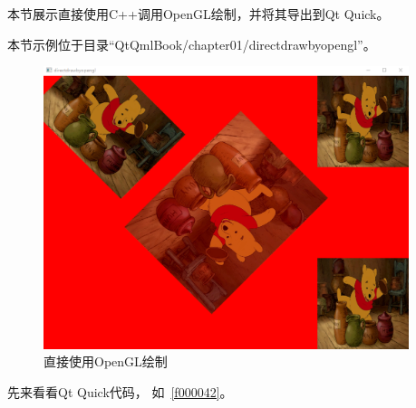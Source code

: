 本节展示直接使用C{\sourcefonttwo{}+}{\sourcefonttwo{}+}调用OpenGL绘制，并将其导出到Qt Quick。

本节示例位于目录“QtQmlBook/chapter01/directdrawbyopengl”。

\begin{figure}[htb] %
\marginnote{\setlength\fboxsep{2pt}\fbox{\footnotesize{\kaishu\figurename\,}\footnotesize{\ref{p000011}}}}\centering %
\includegraphics[width=0.95\textwidth]{the_book_image/p000011.eps} %
\caption{直接使用OpenGL绘制} %
\label{p000011} %
\end{figure}


先来看看Qt Quick代码，
如\filesourcenumbernameone\ \ref{f000042}。

